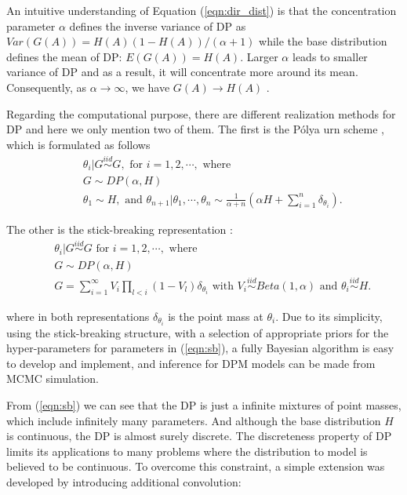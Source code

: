 \documentclass[12pt]{article}
\begin{document}
An intuitive understanding of Equation (\ref{eqn:dir_dist}) is that the concentration parameter $\alpha$ defines the inverse variance of DP as $Var(G(A))=H(A)(1-H(A))/(\alpha+1)$ while the base distribution defines the mean of DP: $E(G(A))=H(A)$. Larger $\alpha$ leads to smaller variance of DP and as a result, it will concentrate more around its mean. Consequently, as $\alpha\rightarrow\infty$, we have $G(A)\rightarrow H(A)$ \cite{ferguson1973bayesian}. 


Regarding the computational purpose, there are different realization methods for DP and here we only mention two of them. The first is the P\'{o}lya urn scheme \cite{blackwell1973ferguson}, which is formulated as follows 
\begin{eqnarray}\label{eqn:polya}
&& \theta_i|G\overset{iid}\sim G, \mbox{ for } i=1,2, \cdots, \mbox{ where} \nonumber\\
&& G\sim DP(\alpha, H)\\
&& \theta_1\sim H, \mbox{ and } \theta_{n+1}|\theta_1,\cdots, \theta_n\sim\frac{1}{\alpha+n}\left(\alpha H+\sum_{i=1}^n\delta_{\theta_i}\right).\nonumber
\end{eqnarray}

\noindent The other is the stick-breaking representation \cite{sethuraman1991constructive}:
\begin{eqnarray}\label{eqn:sb}
&& \theta_i|G\overset{iid}\sim G\mbox{ for } i=1,2, \cdots , \mbox{ where}\nonumber\\
&& G\sim DP(\alpha, H)\\
&& G=\sum_{i=1}^{\infty} V_i\prod_{l<i}(1-V_l)\delta_{\theta_i} \mbox{ with } V_i\overset{iid}\sim Beta(1,\alpha)\mbox{ and }\theta_i\overset{iid}\sim H.\nonumber
\end{eqnarray}

\noindent where in both representations $\delta_{\theta_i}$ is the point mass at $\theta_i$. Due to its simplicity, using the stick-breaking structure,  with a selection of appropriate priors for the hyper-parameters for parameters in (\ref{eqn:sb}), a fully Bayesian algorithm is easy to develop and implement, and inference for DPM models can be made from MCMC simulation.\par

\noindent From (\ref{eqn:sb}) we can see that the DP is just a infinite mixtures of point masses, which include infinitely many parameters. And although the base distribution $H$ is continuous, the DP is almost surely discrete. The discreteness property of DP limits its applications to many problems where the distribution to model is believed to be continuous. To overcome this constraint, a simple extension was developed by introducing additional convolution:
\end{document}
